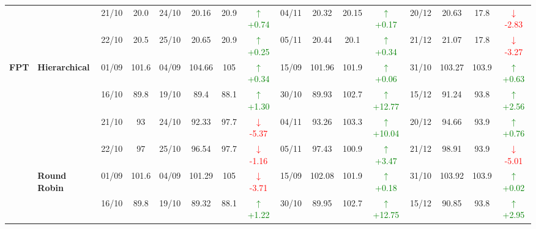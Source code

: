 {\begin{longtable}{llcc|cccc|cccc|cccc}
&
& 21/10 & 20.0 & 24/10 & 20.16 & 20.9 & \textcolor{green}{\(\uparrow\)+0.74} & 04/11 & 20.32 & 20.15 & \textcolor{green}{\(\uparrow\)+0.17} & 20/12 & 20.63 & 17.8 & \textcolor{red}{\(\downarrow\)-2.83} \\

&
& 22/10 & 20.5 & 25/10 & 20.65 & 20.9 & \textcolor{green}{\(\uparrow\)+0.25} & 05/11 & 20.44 & 20.1 & \textcolor{green}{\(\uparrow\)+0.34} & 21/12 & 21.07 & 17.8 & \textcolor{red}{\(\downarrow\)-3.27} \\
\midrule



\multirow{12}{*}{\textbf{FPT}} 
& \textbf{Hierarchical}
& 01/09 & 101.6 & 04/09 & 104.66 & 105 & \textcolor{green}{\(\uparrow\)+0.34} & 15/09 & 101.96 & 101.9 & \textcolor{green}{\(\uparrow\)+0.06} & 31/10 & 103.27 & 103.9 & \textcolor{green}{\(\uparrow\)+0.63} \\

&
& 16/10 & 89.8 & 19/10 & 89.4 & 88.1 & \textcolor{green}{\(\uparrow\)+1.30} & 30/10 & 89.93 & 102.7 & \textcolor{green}{\(\uparrow\)+12.77} & 15/12 & 91.24 & 93.8 & \textcolor{green}{\(\uparrow\)+2.56} \\

&
& 21/10 & 93 & 24/10 & 92.33 & 97.7 & \textcolor{red}{\(\downarrow\)-5.37} & 04/11 & 93.26 & 103.3 & \textcolor{green}{\(\uparrow\)+10.04} & 20/12 & 94.66 & 93.9 & \textcolor{green}{\(\uparrow\)+0.76} \\

&
& 22/10 & 97 & 25/10 & 96.54 & 97.7 & \textcolor{red}{\(\downarrow\)-1.16} & 05/11 & 97.43 & 100.9 & \textcolor{green}{\(\uparrow\)+3.47} & 21/12 & 98.91 & 93.9 & \textcolor{red}{\(\downarrow\)-5.01} \\
\cmidrule(lr){2-16}


& \textbf{Round Robin}
& 01/09 & 101.6 & 04/09 & 101.29 & 105 & \textcolor{red}{\(\downarrow\)-3.71} & 15/09 & 102.08 & 101.9 & \textcolor{green}{\(\uparrow\)+0.18} & 31/10 & 103.92 & 103.9 & \textcolor{green}{\(\uparrow\)+0.02} \\

&
& 16/10 & 89.8 & 19/10 & 89.32 & 88.1 & \textcolor{green}{\(\uparrow\)+1.22} & 30/10 & 89.95 & 102.7 & \textcolor{green}{\(\uparrow\)+12.75} & 15/12 & 90.85 & 93.8 & \textcolor{green}{\(\uparrow\)+2.95} \\


\end{longtable}}

